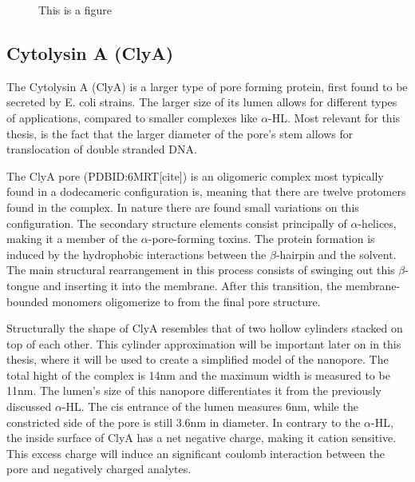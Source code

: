 \begin{figure}[ht]
\begin{centering}
  \caption{This is a figure}
  \label{fig:test}
  \end{centering}
\end{figure}



\subsection{Cytolysin A (ClyA)}

The Cytolysin A (ClyA) is a larger type of pore forming protein, first found to be
secreted by E. coli strains. The larger size of its lumen allows for different types of
applications, compared to smaller complexes like $\alpha$-HL. Most relevant for this
thesis, is the fact that the larger diameter of the pore's stem allows for translocation
of double stranded DNA.

The ClyA pore (PDBID:6MRT[cite]) is an oligomeric complex most typically found in a
 dodecameric configuration is, meaning that there are twelve protomers found in the
complex. In nature there are found small variations on this configuration. The secondary
structure elements consist principally of $\alpha$-helices, making it a member of the $
\alpha$-pore-forming toxins. The protein formation is induced by the hydrophobic
interactions between the $\beta$-hairpin and the solvent. The main structural
rearrangement in this process consists of swinging
out this $\beta$-tongue and inserting it into the membrane. After this transition, the
membrane-bounded monomers oligomerize to from the final pore structure.

Structurally the shape of ClyA resembles that of two hollow cylinders stacked on top of
each other. This cylinder approximation will be important later on in this thesis, where
it will be used to create a simplified model of the nanopore. The total hight of the
complex is
14nm and the maximum width is measured to be 11nm. The lumen's size of this nanopore
differentiates it from the previously discussed $\alpha$-HL. The cis entrance of the
lumen measures 6nm, while the constricted side of the pore is still 3.6nm in diameter. In
contrary to the $\alpha$-HL, the inside surface of ClyA has a net negative charge,
making it cation sensitive. This excess charge will induce an significant
 coulomb interaction between the pore and negatively charged analytes.

